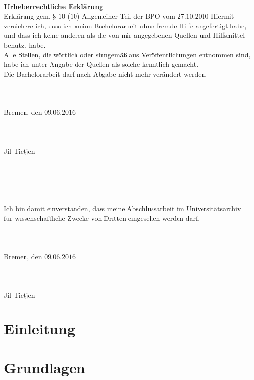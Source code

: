 \documentclass[a4,abstract=on]{scrartcl}
\newcommand*\stdsection{}
\let\stdsection\section
\renewcommand*\section{%
    \clearpage\ifodd\value{page}\else\mbox{}\clearpage\fi
    \stdsection}
\begin{document}
	\newpage
~\\
\textbf{Urheberrechtliche Erklärung}\\
Erklärung gem. § $10$ ($10$) Allgemeiner Teil der BPO vom $27$.$10$.$2010$
Hiermit versichere ich, dass ich meine Bachelorarbeit ohne fremde Hilfe angefertigt habe, und dass ich keine anderen als die von mir angegebenen Quellen und Hilfsmittel benutzt habe.\\
Alle Stellen, die wörtlich oder sinngemäß aus Veröffentlichungen entnommen sind, habe ich unter Angabe der Quellen als solche kenntlich gemacht.\\
Die Bachelorarbeit darf nach Abgabe nicht mehr verändert werden.\\
~\\~\\~\\
Bremen, den $09$.$06$.$2016$\\
~\\~\\~\\
Jil Tietjen
~\\~\\~\\~\\~\\~\\
Ich bin damit einverstanden, dass meine Abschlussarbeit im Universitätsarchiv für wissenschaftliche Zwecke von Dritten eingesehen werden darf.\\
~\\~\\~\\
Bremen, den $09$.$06$.$2016$\\
~\\~\\~\\
Jil Tietjen
\clearpage

	\tableofcontents
	\clearpage

\section{Einleitung}
\section{Grundlagen}
\end{document}
